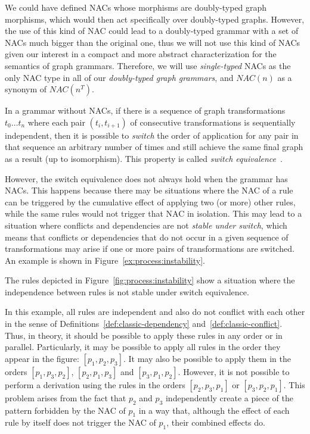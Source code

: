 \begin{remark}
  We could have defined NACs whose morphisms are doubly-typed graph morphisms, which would then act specifically over doubly-typed graphs. However, the use of this kind of NAC could lead to a doubly-typed grammar with a set of NACs much bigger than the original one, thus we will not use this kind of NACs given our interest in a compact and more abstract characterization for the semantics of graph grammars. Therefore, we will use \emph{single-typed} NACs as the only NAC type in all of our \emph{doubly-typed graph grammars}, and $NAC(n)$ as a synonym of $NAC(n^T)$.
\end{remark}

In a grammar without NACs, if there is a sequence of graph transformations $t_0\ldots t_n$ where each pair $(t_i,t_{i+1})$ of consecutive transformations is sequentially independent, then it is possible to \emph{switch} the
order of application for any pair in that sequence an arbitrary number of times and still achieve the same final graph as a result (up to isomorphism). This property is called \emph{switch equivalence}~\cite{Corradini2013}.

However, the switch equivalence does not always hold when the grammar has NACs. This happens because there may be situations where the NAC of a rule can be triggered by the cumulative effect of applying two (or more) other rules, while the same rules would not trigger that NAC in isolation. This may lead to a situation where conflicts and dependencies
	are not \emph{stable under switch}, which means that conflicts or dependencies that do not occur in a given sequence of transformations may arise if one or more pairs of transformations are switched. An example is shown in Figure~\ref{ex:process:instability}.

\begin{example}\label{ex:process:instability}The rules depicted in Figure~\ref{fig:process:instability} show a situation where the independence between rules is not stable under switch equivalence.

  In this example, all rules are independent and also do not conflict with each other in the sense of Definitions~\ref{def:classic-dependency} and~\ref{def:classic-conflict}. 
  Thus, in theory, it should be possible to apply these rules in any order or in parallel. Particularly, it may be possible to apply all rules in the order they appear in the figure: $[p_1, p_2, p_3]$. 
  It may also be possible to apply them in the orders $[p_1, p_3, p_2]$, $[p_2, p_1, p_3]$ and $[p_3, p_1, p_2]$. 
  However, it is not possible to perform a derivation using the rules in the orders $[p_2, p_3, p_1]$ or $[p_3, p_2, p_1]$. This problem arises from the fact that $p_2$ and $p_3$ independently create a piece of the pattern forbidden by the NAC of $p_1$ in a way that, although the effect of each rule by itself does not trigger the NAC of $p_1$, their combined effects do.
\end{example}


